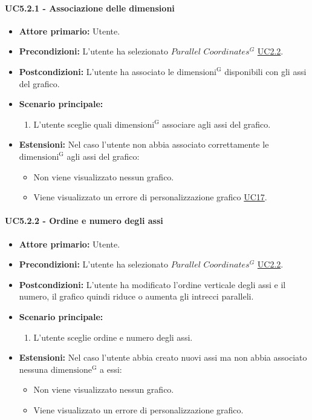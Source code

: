 \paragraph{UC5.2.1 - Associazione delle dimensioni}
\label{sec:UC5.2.1}
    \begin{itemize}
        \item \textbf{Attore primario:} Utente.
        \item \textbf{Precondizioni:} L'utente ha selezionato $Parallel$ $Coordinates^{G}$ \hyperref[sec:UC2.2]{UC2.2}.
	    \item \textbf{Postcondizioni:} L'utente ha associato le ${\mathrm{dimensioni^{G}}}$ disponibili con gli assi del grafico.
	    \item \textbf{Scenario principale:}
	    \begin{enumerate}
	    		\item L'utente sceglie quali ${\mathrm{dimensioni^{G}}}$ associare agli assi del grafico.
		\end{enumerate}
	    \item \textbf{Estensioni:} Nel caso l'utente non abbia associato correttamente le ${\mathrm{dimensioni^{G}}}$ agli assi del grafico:
              \begin{itemize}
                  \item Non viene visualizzato nessun grafico.
                  \item Viene visualizzato un errore di personalizzazione grafico \hyperref[sec:UC17 - Errore di personalizzazione]{UC17}.
              \end{itemize}
    \end{itemize}
\paragraph{UC5.2.2 - Ordine e numero degli assi}
\label{sec:UC5.2.2}
    \begin{itemize}
        \item \textbf{Attore primario:} Utente.
        \item \textbf{Precondizioni:} L'utente ha selezionato $Parallel$ $Coordinates^{G}$ \hyperref[sec:UC2.2]{UC2.2}.
	    \item \textbf{Postcondizioni:} L'utente ha modificato l'ordine verticale degli assi e il numero, il grafico quindi riduce o aumenta gli intrecci paralleli.
	    \item \textbf{Scenario principale:} 
	    \begin{enumerate}
	    		\item L'utente sceglie ordine e numero degli assi.
		\end{enumerate}
	    \item \textbf{Estensioni:} Nel caso l'utente abbia creato nuovi assi ma non abbia associato nessuna ${\mathrm{dimensione^{G}}}$ a essi:
              \begin{itemize}
                  \item Non viene visualizzato nessun grafico.
                  \item Viene visualizzato un errore di personalizzazione grafico.
              \end{itemize}
    \end{itemize}
    
